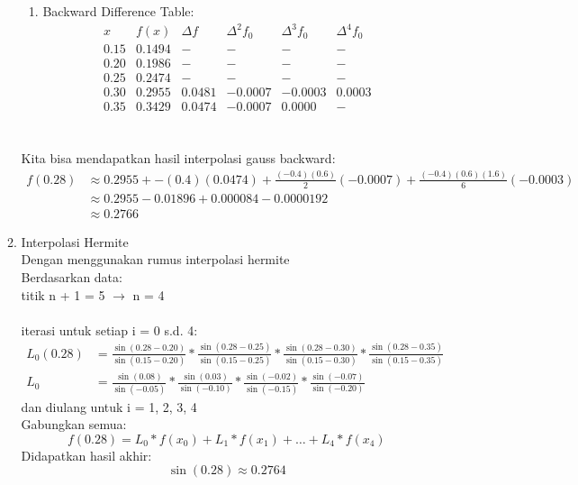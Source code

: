 \documentclass{article}
\begin{document}
\begin{enumerate}
\begin{enumerate}
\begin{enumerate}
            \item Backward Difference Table: \\
            \[
            \begin{array}{c|c|c|c|c|c}
                x & f(x) & \Delta f & \Delta ^2f_0 & \Delta ^3f_0 & \Delta ^4f_0 \\
                \hline
                \num{0,15} & \num{0,1494} & - & - & - & - \\
                \num{0,20} & \num{0,1986} & - & - & - & - \\
                \num{0,25} & \num{0,2474} & - & - & - & - \\
                \num{0,30} & \num{0,2955} & \num{0,0481} & -\num{0,0007} &  -\num{0,0003} & \num{0,0003} \\
                \num{0,35} & \num{0,3429} & \num{0,0474} & -\num{0,0007} & \num{0,0000} & - \\
            \end{array}
            \] \\
        \end{enumerate}
        Kita bisa mendapatkan hasil interpolasi gauss backward:
        \begin{align*}
            f(0.28) &\approx 0.2955 + -(0.4)(0.0474) + \frac{(-0.4)(0.6)}{2}(-0.0007) + \frac{(-0.4)(0.6)(1.6)}{6}(-0.0003) \\
            &\approx 0.2955 - 0.01896 + 0.000084 - 0.0000192 \\
            &\approx 0.2766
        \end{align*}

        \item Interpolasi Hermite \\
        Dengan menggunakan rumus interpolasi hermite \\
        Berdasarkan data: \\
        titik n + 1 = 5 $\rightarrow$ n = 4 \\ \\
        iterasi untuk setiap i = 0 s.d. 4: \\
        \begin{align*}
            L_0(0.28) &= \frac{\sin(0.28 - 0.20)}{\sin(0.15 - 0.20)} * \frac{\sin(0.28 - 0.25)}{\sin(0.15 - 0.25)} * \frac{\sin(0.28 - 0.30)}{\sin(0.15 - 0.30)} * \frac{\sin(0.28 - 0.35)}{\sin(0.15 - 0.35)} \\
            L_0 &= \frac{\sin(0.08)}{\sin(-0.05)} * \frac{\sin(0.03)}{\sin(-0.10)} * \frac{\sin(-0.02)}{\sin(-0.15)} * \frac{\sin(-0.07)}{\sin(-0.20)}
        \end{align*}
        dan diulang untuk i = 1, 2, 3, 4 \\
        Gabungkan semua: \\
        \[
        f(0.28) = L_0 * f(x_0) + L_1 * f(x_1) + \dots + L_4 * f(x_4)
        \]
        Didapatkan hasil akhir: \\
        \[
        \sin(\num{0,28}) \approx \num{0,2764}
        \]


\end{enumerate}
\end{enumerate}
\end{document}
